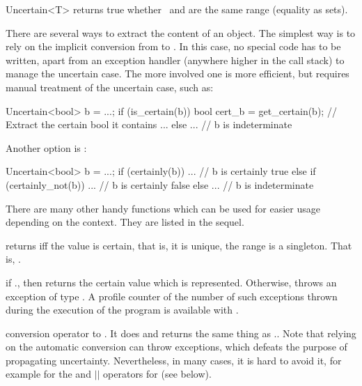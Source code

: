 \begin{ccRefClass}{Uncertain<T>}
  \ccGlue{}
  {returns true whether \ccVar\ and  are the same range (equality as sets).}


  There are several ways to extract the content of an  object.  The simplest way is to
  rely on the implicit conversion from  to .  In this case, no special
  code has to be written, apart from an exception handler (anywhere higher in the call stack) to manage
  the uncertain case.  The more involved one is more efficient, but requires manual treatment
  of the uncertain case, such as:

\begin{ccExampleCode}
  Uncertain<bool> b = ...;
  if (is_certain(b))
    bool cert_b = get_certain(b); // Extract the certain bool it contains
    ...
  else
    ... // b is indeterminate
\end{ccExampleCode}

Another option is :

\begin{ccExampleCode}
  Uncertain<bool> b = ...;
  if (certainly(b))
    ... // b is certainly true
  else if (certainly_not(b))
    ... // b is certainly false
  else
    ... // b is indeterminate
\end{ccExampleCode}

  There are many other handy functions which can be used for easier usage depending
  on the context.  They are listed in the sequel.

  {returns  iff the value is certain, that is, it is unique, the range
   is a singleton. That is, .}

  {if \ccVar., then returns the certain value which is represented.
   Otherwise, throws an exception of type .
   A profile counter of the number of such exceptions thrown during the execution of
   the program is available with .}

  {conversion operator to .  It does and returns the same thing as
   \ccVar..  Note that relying on the automatic conversion
   can throw exceptions, which defeats the purpose of propagating uncertainty.
   Nevertheless, in many cases, it is hard to avoid it, for example for the
   \ccc{&&} and $||$ operators for  (see below).}


\end{ccRefClass}
